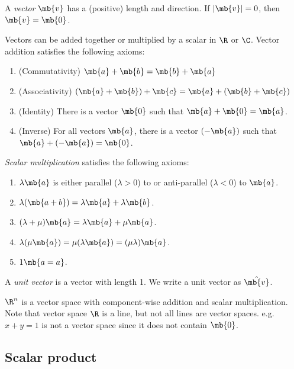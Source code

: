 \documentclass[a4paper]{article}
\begin{document}
\begin{defi}[Vector]
  A \emph{vector} $\mb{v}$ has a (positive) length and direction.  If $|\mb{v}| = 0$, then $\mb{v} = \mb{0}$.

  Vectors can be added together or multiplied by a scalar in $\R$ or $\C$. Vector addition satisfies the following axioms:
  \begin{enumerate}
  \item (Commutativity) $\mb{a} + \mb{b} = \mb{b} + \mb{a}$
  \item (Associativity) $(\mb{a} + \mb{b}) + \mb{c} = \mb{a} + (\mb{b} + \mb{c})$
  \item (Identity) There is a vector $\mb{0}$ such that $\mb{a} + \mb{0} = \mb{a}$.
  \item (Inverse) For all vectors $\mb{a}$, there is a vector $(-\mb{a})$ such that $\mb{a} + (-\mb{a}) = \mb{0}$.
  \end{enumerate}
  \emph{Scalar multiplication} satisfies the following axioms:
  \begin{enumerate}
  \item $\lambda\mb{a}$ is either parallel ($\lambda > 0$) to or anti-parallel ($\lambda < 0$) to $\mb{a}$.
  \item $\lambda(\mb{a + b}) = \lambda\mb{a} + \lambda\mb{b}$.
  \item $(\lambda + \mu)\mb{a} = \lambda\mb{a} + \mu\mb{a}$.
  \item $\lambda(\mu\mb{a}) = \mu(\lambda\mb{a}) = (\mu\lambda)\mb{a}$.
  \item $1\mb{a = a}$.
  \end{enumerate}
\end{defi}

\begin{defi}
  A \emph{unit vector} is a vector with length 1. We write a unit vector as $\hat{\mb{v}}$.
\end{defi}

\begin{eg}
  $\R^n$ is a vector space with component-wise addition and scalar multiplication. Note that vector space $\R$ is a line, but not all lines are vector spaces. e.g. $x + y = 1$ is not a vector space since it does not contain $\mb{0}$.
\end{eg}

\subsection{Scalar product}
\end{document}
